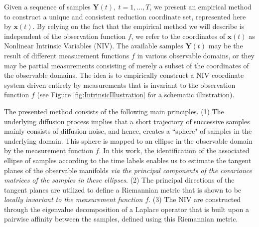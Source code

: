 \documentclass[aip,jcp,preprint]{revtex4-1}
\begin{document}
Given a sequence of samples $\mathbf{Y}(t), \ t=1,\ldots,T$, we present an empirical method to construct a unique and consistent reduction coordinate set, represented here by $\mathbf{x}(t)$.
%
By relying on the fact that the empirical method we will describe is independent of the observation function $f$,
we refer to the coordinates of $\mathbf{x}(t)$ as Nonlinear Intrinsic Variables (NIV).
%
The available samples $\mathbf{Y}(t)$ may be the result of different measurement functions $f$ in various observable domains,
or they may be partial measurements consisting of merely a subset of the coordinates of the observable domains.
%
The idea is to empirically construct a NIV coordinate system driven entirely by measurements that is invariant to the observation function $f$ (see Figure \ref{fig:IntrinsicIllustration} for a schematic illustration).

The presented method consists of the following main principles.
%
(1) The underlying diffusion process implies that a short trajectory of successive samples mainly consists of diffusion noise, and hence, creates a ``sphere" of samples in the underlying domain.
%
This sphere is mapped to an ellipse in the observable domain by the measurement function $f$.
%
In this work, the identification of the associated ellipse of samples according to the time labels enables us
to estimate the tangent planes of the observable manifolds {\em via the principal components of the covariance matrices of the samples in these ellipses}.
%
(2) The principal directions of the tangent planes are utilized to define a Riemannian metric that is shown to be {\em locally invariant to the measurement function $f$}.
%
(3) The NIV are constructed through the eigenvalue decomposition of a Laplace operator that is built upon a pairwise affinity between the samples, defined using this Riemannian metric.
\end{document}
